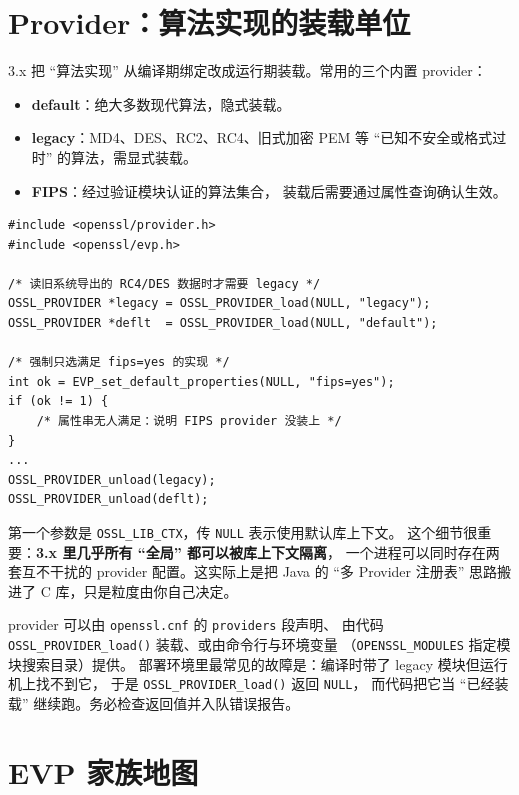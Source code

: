 \documentclass[12pt,a4paper,fontset=fandol]{ctexbook}
\newcommand{\Fn}[1]{\texttt{#1()}}
\newcommand{\Tp}[1]{\texttt{#1}}
\begin{document}
\section{Provider：算法实现的装载单位}

3.x 把 ``算法实现'' 从编译期绑定改成运行期装载。常用的三个内置 provider：

\begin{itemize}
  \item \textbf{default}：绝大多数现代算法，隐式装载。
  \item \textbf{legacy}：MD4、DES、RC2、RC4、旧式加密 PEM 等
        ``已知不安全或格式过时'' 的算法，需显式装载。
  \item \textbf{FIPS}：经过验证模块认证的算法集合，
        装载后需要通过属性查询确认生效。
\end{itemize}

\begin{lstlisting}[caption={显式装载 provider 并用属性串约束选择}]
#include <openssl/provider.h>
#include <openssl/evp.h>

/* 读旧系统导出的 RC4/DES 数据时才需要 legacy */
OSSL_PROVIDER *legacy = OSSL_PROVIDER_load(NULL, "legacy");
OSSL_PROVIDER *deflt  = OSSL_PROVIDER_load(NULL, "default");

/* 强制只选满足 fips=yes 的实现 */
int ok = EVP_set_default_properties(NULL, "fips=yes");
if (ok != 1) {
    /* 属性串无人满足：说明 FIPS provider 没装上 */
}
...
OSSL_PROVIDER_unload(legacy);
OSSL_PROVIDER_unload(deflt);
\end{lstlisting}

第一个参数是 \Tp{OSSL\_LIB\_CTX}，传 \Tp{NULL} 表示使用默认库上下文。
这个细节很重要：\textbf{3.x 里几乎所有 ``全局'' 都可以被库上下文隔离}，
一个进程可以同时存在两套互不干扰的 provider 配置。这实际上是把
Java 的 ``多 Provider 注册表'' 思路搬进了 C 库，只是粒度由你自己决定。

\begin{note}[title=配置文件的三种生效路径]
provider 可以由 \Tp{openssl.cnf} 的 \texttt{providers} 段声明、
由代码 \Fn{OSSL\_PROVIDER\_load} 装载、或由命令行与环境变量
（\Tp{OPENSSL\_MODULES} 指定模块搜索目录）提供。
部署环境里最常见的故障是：编译时带了 legacy 模块但运行机上找不到它，
于是 \Fn{OSSL\_PROVIDER\_load} 返回 \Tp{NULL}，
而代码把它当 ``已经装载'' 继续跑。务必检查返回值并入队错误报告。
\end{note}

\section{EVP 家族地图}
\end{document}
